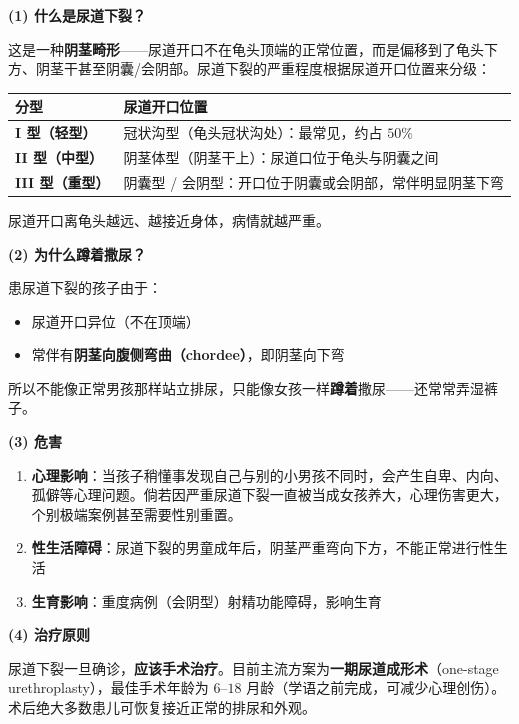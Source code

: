 \vspace{0.5em}
\noindent\textbf{(1) 什么是尿道下裂？}

这是一种\textbf{阴茎畸形}——尿道开口不在龟头顶端的正常位置，而是偏移到了龟头下方、阴茎干甚至阴囊/会阴部。尿道下裂的严重程度根据尿道开口位置来分级：

\begin{tabular}{|p{4cm}|p{9cm}|}
\hline
\textbf{分型} & \textbf{尿道开口位置} \\
\hline
\textbf{I 型（轻型）} & 冠状沟型（龟头冠状沟处）：最常见，约占 $50\%$ \\
\hline
\textbf{II 型（中型）} & 阴茎体型（阴茎干上）：尿道口位于龟头与阴囊之间 \\
\hline
\textbf{III 型（重型）} & 阴囊型 / 会阴型：开口位于阴囊或会阴部，常伴明显阴茎下弯 \\
\hline
\end{tabular}

尿道开口离龟头越远、越接近身体，病情就越严重。

\vspace{0.3em}
\noindent\textbf{(2) 为什么蹲着撒尿？}

患尿道下裂的孩子由于：
\begin{itemize}
	\item 尿道开口异位（不在顶端）
	\item 常伴有\textbf{阴茎向腹侧弯曲（chordee）}，即阴茎向下弯
\end{itemize}
所以不能像正常男孩那样站立排尿，只能像女孩一样\textbf{蹲着}撒尿——还常常弄湿裤子。

\vspace{0.3em}
\noindent\textbf{(3) 危害}

\begin{enumerate}
	\item \textbf{心理影响}：当孩子稍懂事发现自己与别的小男孩不同时，会产生自卑、内向、孤僻等心理问题。倘若因严重尿道下裂一直被当成女孩养大，心理伤害更大，个别极端案例甚至需要性别重置。
	\item \textbf{性生活障碍}：尿道下裂的男童成年后，阴茎严重弯向下方，不能正常进行性生活
	\item \textbf{生育影响}：重度病例（会阴型）射精功能障碍，影响生育
\end{enumerate}

\vspace{0.3em}
\noindent\textbf{(4) 治疗原则}

尿道下裂一旦确诊，\textbf{应该手术治疗}。目前主流方案为\textbf{一期尿道成形术}（one-stage urethroplasty），最佳手术年龄为 $6$--$18$ 月龄（学语之前完成，可减少心理创伤）。术后绝大多数患儿可恢复接近正常的排尿和外观。


